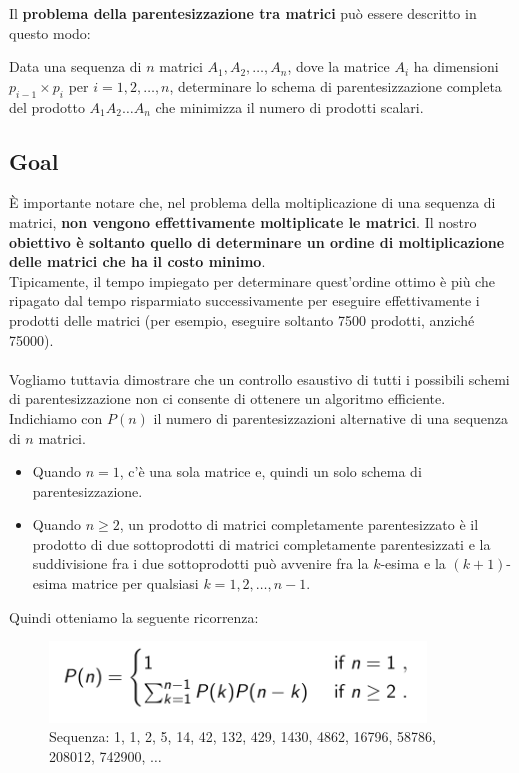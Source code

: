 Il \textbf{problema della parentesizzazione tra matrici} può essere
descritto in questo modo:
\begin{myblockquote}
  Data una sequenza di $n$
  matrici $A_1, A_2, \ldots, A_n$, dove la matrice $A_i$ ha dimensioni
  $p_{i-1} \times p_i$ per $i = 1,2, \ldots,n$, determinare lo schema di
  parentesizzazione completa del prodotto $A_1A_2 \ldots A_n$ che minimizza
  il numero di prodotti scalari.
\end{myblockquote}


\subsection{Goal}

È importante notare che, nel problema della moltiplicazione di una
sequenza di matrici, \textbf{non vengono effettivamente moltiplicate le
  matrici}. Il nostro \textbf{obiettivo è soltanto quello di determinare
  un ordine di moltiplicazione delle matrici che ha il costo minimo}.\\
Tipicamente, il tempo impiegato per determinare quest'ordine ottimo è
più che ripagato dal tempo risparmiato successivamente per eseguire
effettivamente i prodotti delle matrici (per esempio, eseguire soltanto
7500 prodotti, anziché 75000).\\
\\
Vogliamo tuttavia dimostrare che un controllo esaustivo di tutti i
possibili schemi di parentesizzazione non ci consente di ottenere un
algoritmo efficiente. Indichiamo con $P(n)$ il numero di
parentesizzazioni alternative di una sequenza di $n$ matrici.
\begin{itemize}
  \item Quando
        $n=1$, c'è una sola matrice e, quindi un solo schema di
        parentesizzazione.
  \item Quando $n \ge 2$, un prodotto di matrici
        completamente parentesizzato è il prodotto di due sottoprodotti di
        matrici completamente parentesizzati e la suddivisione fra i due
        sottoprodotti può avvenire fra la $k$-esima e la $(k+1)$-esima matrice per
        qualsiasi $k=1,2,\ldots,n-1$.
\end{itemize}

Quindi otteniamo la seguente ricorrenza:

\begin{figure}[H]
  \centering
  \includegraphics[width=10cm, keepaspectratio]{capitoli/programmazione_dinamica/imgs/matrix1.png}
  \caption{Sequenza: 1, 1, 2, 5, 14, 42, 132, 429, 1430, 4862, 16796, 58786, 208012, 742900,
    $\ldots$}
\end{figure}

